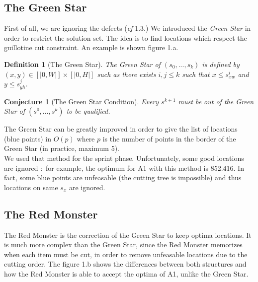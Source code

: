 \documentclass{article}
\newtheorem{definition}{Definition}
\newtheorem{conjecture}{Conjecture}
\begin{document}
        \subsection{The Green Star}
        First of all, we are ignoring the defects (\textit{cf} 1.3.)
        We introduced the \textit{Green Star} in order to restrict the solution set. The idea is to find locations which respect the guillotine cut constraint. An example is shown figure 1.a.
        
        \begin{definition}[The Green Star]
            The Green Star of $(s_0, ..., s_k)$ is defined by $ (x, y) \in [|0, W|]\times[|0, H|]$ such as there exists $i, j \leq k$ such that $x \leq s^i_{xw}$ and $y \leq s^j_{yh}$.
        \end{definition}
        
        \begin{conjecture}[The Green Star Condition]
            Every $s^{k + 1}$ must be out of the Green Star of $(s^0, ..., s^k)$ to be qualified.
        \end{conjecture}
        The Green Star can be greatly improved in order to give the list of locations (blue points) in $O(p)$ where $p$ is the number of points in the border of the Green Star (in practice, maximum 5).\\
        We used that method for the sprint phase. Unfortunately, some good locations are ignored : for example, the optimum for A1 with this method is 852.416. In fact, some blue points are unfeasable (the cutting tree is impossible) and thus locations on same $s_x$ are ignored.

        \subsection{The Red Monster}
    The Red Monster is the correction of the Green Star to keep optima locations. It is much more complex than the Green Star, since the Red Monster memorizes when each item must be cut, in order to remove unfeasable locations due to the cutting order.
    The figure 1.b shows the differences between both structures and how the Red Monster is able to accept the optima of A1, unlike the Green Star.
\end{document}
